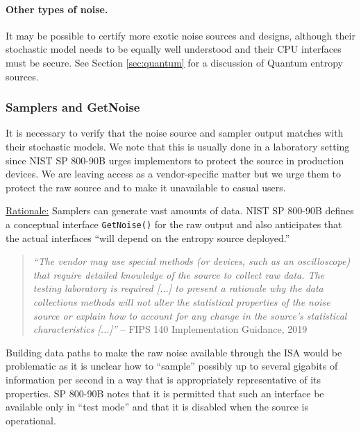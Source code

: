     \paragraph{Other types of noise.}
    It may be possible to certify more exotic noise sources and designs,
    although their stochastic model needs to be equally well understood
    and their CPU interfaces must be secure.
    See Section \ref{sec:quantum} for a discussion of Quantum entropy
    sources.


\subsubsection{Samplers and GetNoise}

    It is necessary to verify that the noise source and sampler output
    matches with their stochastic models. We note that this is
    usually done in a laboratory setting since NIST SP 800-90B \cite{TuBaKe+18}
    urges implementors to protect the source in production devices.
    We are leaving access as a vendor-specific matter but we urge them to
    protect the raw source and to make it unavailable to casual users.

    \underline{Rationale:}
    Samplers can generate vast amounts of data. NIST SP 800-90B
    \cite{TuBaKe+18} defines a conceptual interface \verb|GetNoise()|
    for the raw output and also anticipates that the actual
    interfaces ``will depend on the entropy source deployed.''

    \begin{quote}
    \emph{``The vendor may use special methods (or devices, such as an
    oscilloscope) that require detailed knowledge of the source to
    collect raw data. The testing laboratory is required [...] to
    present a rationale why the data collections methods will not alter
    the statistical properties
    of the noise source or explain how to account for any change
    in the source’s statistical characteristics [...]''}
    \flushright -- FIPS 140 Implementation Guidance, 2019 \cite{NICC19}
    \end{quote}

    Building data paths to make the raw noise available through the ISA
    would be problematic as it is unclear how to ``sample''
    possibly up to several gigabits of information per second in a way
    that is appropriately representative of its properties. SP 800-90B
    notes that it is permitted that such an interface be available only in
    ``test mode'' and that it is disabled when the source is operational.


